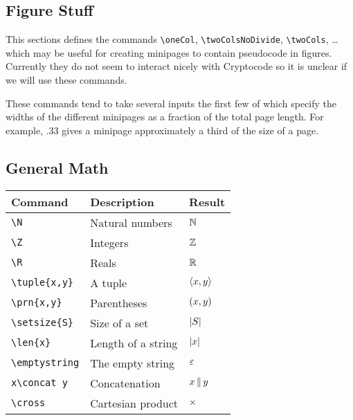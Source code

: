 \documentclass[11pt,twoside]{report}
\begin{document}
\subsection{Figure Stuff}
This sections defines the commands \lstinline$\oneCol$, \lstinline$\twoColsNoDivide$, \lstinline$\twoCols$, \dots which may be useful for creating minipages to contain pseudocode in figures.
Currently they do not seem to interact nicely with Cryptocode so it is unclear if we will use these commands.

These commands tend to take several inputs the first few of which specify the widths of the different minipages as a fraction of the total page length. For example, .33 gives a minipage approximately a third of the size of a page.

\subsection{General Math}
\begin{center}
\begin{tabular}{l l l}
	\textbf{Command} & \textbf{Description} & \textbf{Result} \\\hline
	\lstinline$\N$ & Natural numbers & ${{\mathbb N}}$  \\
	\lstinline$\Z$ & Integers & ${{\mathbb Z}}$  \\
	\lstinline$\R$ & Reals & ${{\mathbb R}}$  \\
	\lstinline$\tuple{x,y}$ & A tuple & $\langle{x,y}\rangle$  \\
	\lstinline$\prn{x,y}$ & Parentheses & $\left(x,y\right)$  \\
	\lstinline$\setsize{S}$ & Size of a set & $\left|{S}\right|$  \\
	\lstinline$\len{x}$ & Length of a string & $\left|{x}\right|$  \\
	\lstinline$\emptystring$ & The empty string  & $\varepsilon$  \\
	\lstinline$x\concat y$ & Concatenation & $x {\,\|\,} y$ \\
	\lstinline$\cross$ & Cartesian product & $\times$
\end{tabular}
\end{center}

\end{document}
